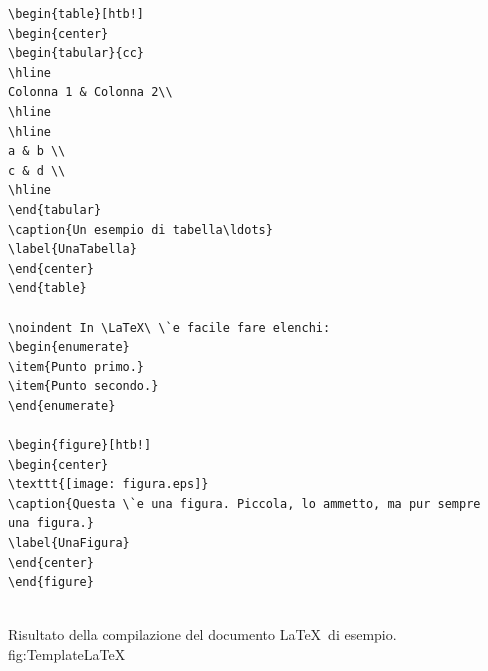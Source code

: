 \begin{verbatim}
\begin{table}[htb!]
\begin{center}
\begin{tabular}{cc}
\hline
Colonna 1 & Colonna 2\\
\hline
\hline
a & b \\
c & d \\
\hline
\end{tabular}
\caption{Un esempio di tabella\ldots}
\label{UnaTabella}
\end{center}
\end{table}

\noindent In \LaTeX\ \`e facile fare elenchi:
\begin{enumerate}
\item{Punto primo.}
\item{Punto secondo.}
\end{enumerate}

\begin{figure}[htb!]
\begin{center}
\texttt{[image: figura.eps]}
\caption{Questa \`e una figura. Piccola, lo ammetto, ma pur sempre
una figura.}
\label{UnaFigura}
\end{center}
\end{figure}


\end{verbatim}

\panelfig
{}
{Risultato della compilazione del documento \LaTeX\ di esempio.}
{fig:TemplateLaTeX}

